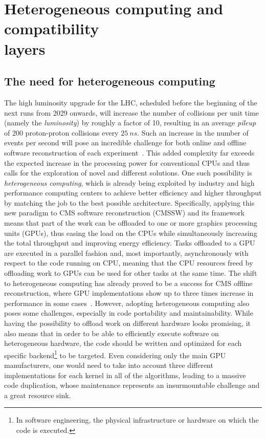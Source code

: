 \section[Heterogeneous computing and compatibility layers]{Heterogeneous computing and compatibility \\ layers}
\label{ch:heterogeneous_compatibility}

\subsection{The need for heterogeneous computing}
\label{ch:heterogeneous}
The high luminosity upgrade for the LHC, scheduled before the beginning of the next runs from 2029 onwards, will increase the number of collisions per unit time (namely the \textit{luminosity}) by roughly a factor of 10, resulting in an average \textit{pileup} of 200 proton-proton collisions every $25~ns$. Such an increase in the number of events per second will pose an incredible challenge for both online and offline software reconstruction of each experiment~\cite{high_luminosity}. This added complexity far exceeds the expected increase in the processing power for conventional CPUs and thus calls for the exploration of novel and different solutions. One such possibility is \textit{heterogeneous computing}, which is already being exploited by industry and high performance computing centers to achieve better efficiency and higher throughput by matching the job to the best possible architecture. Specifically, applying this new paradigm to CMS software reconstruction (CMSSW) and its framework means that part of the work can be offloaded to one or more graphics processing units (GPUs), thus easing the load on the CPUs while simultaneously increasing the total throughput and improving energy efficiency. Tasks offloaded to a GPU are executed in a parallel fashion and, most importantly, asynchronously with respect to the code running on CPU, meaning that the CPU resources freed by offloading work to GPUs can be used for other tasks at the same time. The shift to heterogeneous computing has already proved to be a success for CMS offline reconstruction, where GPU implementations show up to three times increase in performance in some cases~\cite{high_luminosity}. However, adopting heterogeneous computing also poses some challenges, especially in code portability and maintainability. While having the possibility to offload work on different hardware looks promising, it also means that in order to be able to efficiently execute software on heterogeneous hardware, the code should be written and optimized for each specific backend\footnote{In software engineering, the physical infrastructure or hardware on which the code is executed.} to be targeted. Even considering only the main GPU manufacturers, one would need to take into account three different implementations for each kernel in all of the algorithms, leading to a massive code duplication, whose maintenance represents an insurmountable challenge and a great resource sink. 

